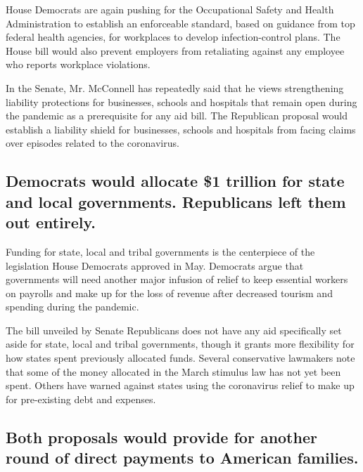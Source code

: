 House Democrats are again pushing for the Occupational Safety and Health
Administration to establish an enforceable standard, based on guidance
from top federal health agencies, for workplaces to develop
infection-control plans. The House bill would also prevent employers
from retaliating against any employee who reports workplace violations.

In the Senate, Mr. McConnell has repeatedly said that he views
strengthening liability protections for businesses, schools and
hospitals that remain open during the pandemic as a prerequisite for any
aid bill. The Republican proposal would establish a liability shield for
businesses, schools and hospitals from facing claims over episodes
related to the coronavirus.

\hypertarget{democrats-would-allocate-1-trillion-for-state-and-local-governments-republicans-left-them-out-entirely}{%
\subsection{Democrats would allocate \$1 trillion for state and local
governments. Republicans left them out
entirely.}\label{democrats-would-allocate-1-trillion-for-state-and-local-governments-republicans-left-them-out-entirely}}

Funding for state, local and tribal governments is the centerpiece of
the legislation House Democrats approved in May. Democrats argue that
governments will need another major infusion of relief to keep essential
workers on payrolls and make up for the loss of revenue after decreased
tourism and spending during the pandemic.

The bill unveiled by Senate Republicans does not have any aid
specifically set aside for state, local and tribal governments, though
it grants more flexibility for how states spent previously allocated
funds. Several conservative lawmakers note that some of the money
allocated in the March stimulus law has not yet been spent. Others have
warned against states using the coronavirus relief to make up for
pre-existing debt and expenses.

\hypertarget{both-proposals-would-provide-for-another-round-of-direct-payments-to-american-families}{%
\subsection{Both proposals would provide for another round of direct
payments to American
families.}\label{both-proposals-would-provide-for-another-round-of-direct-payments-to-american-families}}

